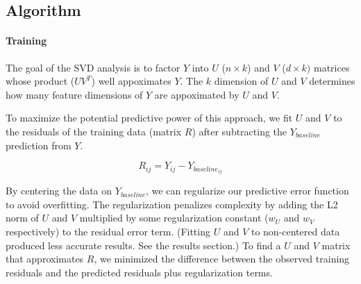 \documentclass[12pt]{article}
\begin{document}

\subsection*{Algorithm}
\paragraph{Training} The goal of the SVD analysis is to factor $Y$ into $U$ ($n \times k$) and $V$ ($d \times k)$ matrices whose product ($U V^T$) well appoximates $Y$. The $k$ dimension of $U$ and $V$ determines how many feature dimensions of $Y$ are appoximated by $U$ and $V$.

To maximize the potential predictive power of this approach, we fit $U$ and $V$ to the residuals of the training data (matrix $R$) after subtracting the $Y_{baseline}$ prediction from $Y$.

 $$ R_{ij} = Y_{ij} - Y_{baseline_{ij}} $$

 By centering the data on $Y_{baseline}$, we can regularize our predictive error function to avoid overfitting. The regularization penalizes complexity by adding the L2 norm of $U$ and $V$ multiplied by some regularization constant ($w_U$ and $w_V$ respectively) to the residual error term. (Fitting $U$ and $V$ to non-centered data produced less accurate results. See the results section.) To find a $U$ and $V$ matrix that approximates $R$, we minimized the difference between the observed training residuals and the predicted residuals plus regularization terms.
\end{document}
